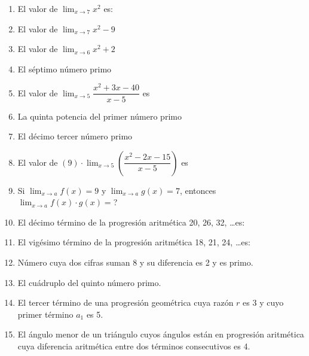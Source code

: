 \documentclass[letterpaper,10pt,twoside]{article}
\begin{document}
\begin{multicols}{2}
\begin{enumerate}
\item El valor de $\displaystyle{\lim_{x\rightarrow 7}x^{2}}$ es:
\item El valor de $\displaystyle{\lim_{x\rightarrow 7}x^{2}-9}$
\item El valor de $\displaystyle{\lim_{x\rightarrow 6}x^{2}+2}$
\item El séptimo número primo
\item El valor de $\displaystyle{\lim_{x\rightarrow 5}}\dfrac{x^{2}+3x-40}{x-5}$ es
\item La quinta potencia del primer número primo
\item El décimo tercer número primo
\item El valor de \quad $\displaystyle{(9)\cdot\lim_{x\rightarrow 5}
\left(\dfrac{x^{2}-2x-15}{x-5}\right)}$ es
\item Si $\displaystyle{\lim_{x\rightarrow a}f(x)}=9$ y $\displaystyle{\lim_{x\rightarrow a}g(x)}=7$, entonces $\displaystyle{\lim_{x\rightarrow a}f(x)\cdot g(x)}=$?
\item El décimo término de la progresión aritmética 20, 26, 32, \ldots es:
\item El vigésimo término de la progresión aritmética 18, 21, 24, \ldots es:
\item Número cuya dos cifras suman 8 y su diferencia es 2 y es primo.
\item El cuádruplo del quinto número primo.
\item El tercer término de una progresión geométrica cuya razón $r$ es 3 y cuyo primer término $a_{1}$ es 5.
\item El ángulo menor de un triángulo cuyos ángulos están en progresión aritmética cuya diferencia aritmética entre dos términos consecutivos es 4.


\end{enumerate}
\end{multicols}
\end{document}
